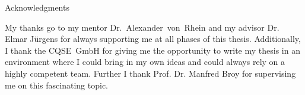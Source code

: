 \thispagestyle{empty}

\vspace*{20mm}

\begin{center}
{ Acknowledgments}
\end{center}

\vspace{10mm}

My thanks go to my mentor Dr.~Alexander~von~Rhein and my advisor Dr. Elmar Jürgens for always supporting me at all phases of this thesis. Additionally, I thank the CQSE~GmbH for giving me the opportunity to write my thesis in an environment where I could bring in my own ideas and could always rely on a highly competent team. Further I thank Prof. Dr. Manfred Broy for supervising me on this fascinating topic.

\cleardoublepage{}

